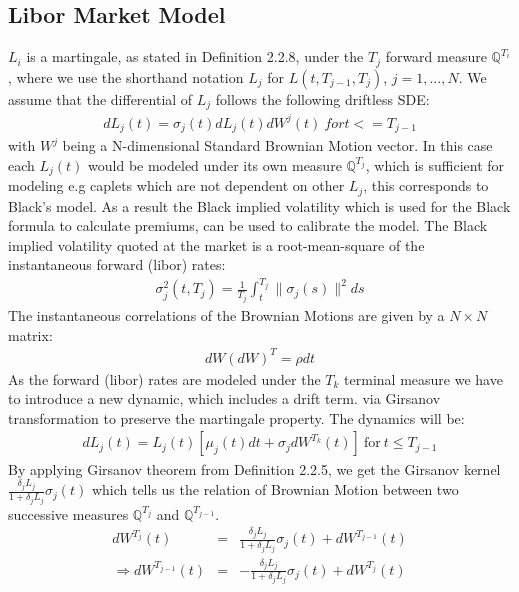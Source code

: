 \documentclass[11pt]{article}
\numberwithin{equation}{subsection}
\begin{document}
\subsection{Libor Market Model}
\(L_i\) is a martingale, as stated in Definition 2.2.8, under the \(T_{j}\) forward measure \(\mathbb{Q}^{T_i}\), where we use the shorthand notation \(L_{j}\) for \(L(t, T_{j-1}, T_{j})\), \(j=1,...,N\). We assume that the differential of \(L_{j}\) follows the following driftless SDE:
\begin{eqnarray}
	dL_{j}(t) = \sigma_{j}(t) dL_{j}(t)dW^{j}(t) \ for t <= T_{j-1}
\end{eqnarray}
with \(W^{j}\) being a N-dimensional Standard Brownian Motion vector. In this case each \(L_{j}(t)\) would be modeled under its own measure \(\mathbb{Q}^{T_j}\), which is sufficient for modeling e.g caplets which are not dependent on other \(L_{j}\), this corresponds to Black's model. As a result the Black implied volatility which is used for the Black formula to calculate premiums, can be used to calibrate the model. The Black implied volatility quoted at the market is a root-mean-square of the instantaneous forward (libor) rates:
\begin{eqnarray*}
	\sigma_{j}^{2}(t, T_j) = \frac{1}{T_j} \int_{t}^{T_j} \|\sigma_{j}(s)\|^{2} ds
\end{eqnarray*}
The instantaneous correlations of the Brownian Motions are given by a \(N \times N\) matrix:
\begin{eqnarray*}
	dW(dW)^{T} = \rho dt
\end{eqnarray*}
As the forward (libor) rates are modeled under the \(T_{k}\) terminal measure we have to introduce a new dynamic, which includes a drift term. via Girsanov transformation to preserve the martingale property. The dynamics will be:
\begin{eqnarray}
	dL_{j}(t) = L_{j}(t)[\mu_{j}(t)dt + \sigma_{j} dW^{T_k}(t)] \ \text{for} \ t \leq T_{j-1}
\end{eqnarray}
By applying Girsanov theorem from Definition 2.2.5, we get the Girsanov kernel \(\frac{\delta_{j}L_{j}}{1+\delta_{j}L_{j}}\sigma_{j}(t)\)  which tells us the relation of Brownian Motion between two successive measures \(\mathbb{Q}^{T_j}\) and \(\mathbb{Q}^{T_{j-1}}\).
\begin{eqnarray*}
	dW^{T_j}(t) &=& \frac{\delta_{j}L_{j}}{1+\delta_{j}L_{j}}\sigma_{j}(t) + dW^{T_{j-1}}(t) \\
	\Rightarrow dW^{T_{j-1}}(t) &=& -\frac{\delta_{j}L_{j}}{1+\delta_{j}L_{j}}\sigma_{j}(t) + dW^{T_{j}}(t)
\end{eqnarray*}
\end{document}
